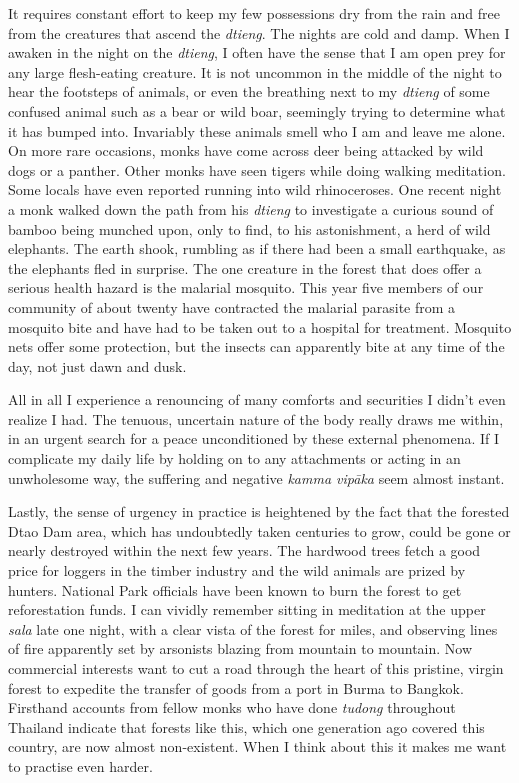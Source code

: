 It requires constant effort to keep my few possessions dry from the rain
and free from the creatures that ascend the \emph{dtieng}. The nights
are cold and damp. When I awaken in the night on the \emph{dtieng}, I
often have the sense that I am open prey for any large flesh-eating
creature. It is not uncommon in the middle of the night to hear the
footsteps of animals, or even the breathing next to my \emph{dtieng} of
some confused animal such as a bear or wild boar, seemingly trying to
determine what it has bumped into. Invariably these animals smell who I
am and leave me alone. On more rare occasions, monks have come across
deer being attacked by wild dogs or a panther. Other monks have seen
tigers while doing walking meditation. Some locals have even reported
running into wild rhinoceroses. One recent night a monk walked down the
path from his \emph{dtieng} to investigate a curious sound of bamboo
being munched upon, only to find, to his astonishment, a herd of wild
elephants. The earth shook, rumbling as if there had been a small
earthquake, as the elephants fled in surprise. The one creature in the
forest that does offer a serious health hazard is the malarial mosquito.
This year five members of our community of about twenty have contracted
the malarial parasite from a mosquito bite and have had to be taken out
to a hospital for treatment. Mosquito nets offer some protection, but
the insects can apparently bite at any time of the day, not just dawn
and dusk.

All in all I experience a renouncing of many comforts and securities I
didn't even realize I had. The tenuous, uncertain nature of the body
really draws me within, in an urgent search for a peace unconditioned by
these external phenomena. If I complicate my daily life by holding on to
any attachments or acting in an unwholesome way, the suffering and
negative \emph{kamma vipāka} seem almost instant.

Lastly, the sense of urgency in practice is heightened by the fact that
the forested Dtao Dam area, which has undoubtedly taken centuries to
grow, could be gone or nearly destroyed within the next few years. The
hardwood trees fetch a good price for loggers in the timber industry and
the wild animals are prized by hunters. National Park officials have
been known to burn the forest to get reforestation funds. I can vividly
remember sitting in meditation at the upper \emph{sala} late one night,
with a clear vista of the forest for miles, and observing lines of fire
apparently set by arsonists blazing from mountain to mountain. Now
commercial interests want to cut a road through the heart of this
pristine, virgin forest to expedite the transfer of goods from a port in
Burma to Bangkok. Firsthand accounts from fellow monks who have done
\emph{tudong} throughout Thailand indicate that forests like this, which
one generation ago covered this country, are now almost non-existent.
When I think about this it makes me want to practise even harder.

